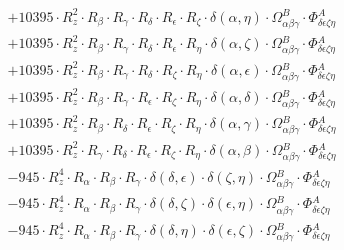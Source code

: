 \documentclass{article}
\begin{document}
\begin{equation}
\begin{array}{c}
 \\[0.2em] 		 + 10395 \cdot R_{z}^{2} \cdot R_{\beta{}} \cdot R_{\gamma{}} \cdot R_{\delta{}} \cdot R_{\epsilon{}} \cdot R_{\zeta{}} \cdot \delta{}\left(\alpha{}, \eta{}\right) \cdot \Omega{}^{B}_{\alpha{}\beta{}\gamma{}} \cdot \Phi{}^{A}_{\delta{}\epsilon{}\zeta{}\eta{}} 
 \\[0.2em] 		 + 10395 \cdot R_{z}^{2} \cdot R_{\beta{}} \cdot R_{\gamma{}} \cdot R_{\delta{}} \cdot R_{\epsilon{}} \cdot R_{\eta{}} \cdot \delta{}\left(\alpha{}, \zeta{}\right) \cdot \Omega{}^{B}_{\alpha{}\beta{}\gamma{}} \cdot \Phi{}^{A}_{\delta{}\epsilon{}\zeta{}\eta{}} 
 \\[0.2em] 		 + 10395 \cdot R_{z}^{2} \cdot R_{\beta{}} \cdot R_{\gamma{}} \cdot R_{\delta{}} \cdot R_{\zeta{}} \cdot R_{\eta{}} \cdot \delta{}\left(\alpha{}, \epsilon{}\right) \cdot \Omega{}^{B}_{\alpha{}\beta{}\gamma{}} \cdot \Phi{}^{A}_{\delta{}\epsilon{}\zeta{}\eta{}} 
 \\[0.2em] 		 + 10395 \cdot R_{z}^{2} \cdot R_{\beta{}} \cdot R_{\gamma{}} \cdot R_{\epsilon{}} \cdot R_{\zeta{}} \cdot R_{\eta{}} \cdot \delta{}\left(\alpha{}, \delta{}\right) \cdot \Omega{}^{B}_{\alpha{}\beta{}\gamma{}} \cdot \Phi{}^{A}_{\delta{}\epsilon{}\zeta{}\eta{}} 
 \\[0.2em] 		 + 10395 \cdot R_{z}^{2} \cdot R_{\beta{}} \cdot R_{\delta{}} \cdot R_{\epsilon{}} \cdot R_{\zeta{}} \cdot R_{\eta{}} \cdot \delta{}\left(\alpha{}, \gamma{}\right) \cdot \Omega{}^{B}_{\alpha{}\beta{}\gamma{}} \cdot \Phi{}^{A}_{\delta{}\epsilon{}\zeta{}\eta{}} 
 \\[0.2em] 		 + 10395 \cdot R_{z}^{2} \cdot R_{\gamma{}} \cdot R_{\delta{}} \cdot R_{\epsilon{}} \cdot R_{\zeta{}} \cdot R_{\eta{}} \cdot \delta{}\left(\alpha{}, \beta{}\right) \cdot \Omega{}^{B}_{\alpha{}\beta{}\gamma{}} \cdot \Phi{}^{A}_{\delta{}\epsilon{}\zeta{}\eta{}} 
 \\[0.2em] 		 - 945 \cdot R_{z}^{4} \cdot R_{\alpha{}} \cdot R_{\beta{}} \cdot R_{\gamma{}} \cdot \delta{}\left(\delta{}, \epsilon{}\right) \cdot \delta{}\left(\zeta{}, \eta{}\right) \cdot \Omega{}^{B}_{\alpha{}\beta{}\gamma{}} \cdot \Phi{}^{A}_{\delta{}\epsilon{}\zeta{}\eta{}} 
 \\[0.2em] 		 - 945 \cdot R_{z}^{4} \cdot R_{\alpha{}} \cdot R_{\beta{}} \cdot R_{\gamma{}} \cdot \delta{}\left(\delta{}, \zeta{}\right) \cdot \delta{}\left(\epsilon{}, \eta{}\right) \cdot \Omega{}^{B}_{\alpha{}\beta{}\gamma{}} \cdot \Phi{}^{A}_{\delta{}\epsilon{}\zeta{}\eta{}} 
 \\[0.2em] 		 - 945 \cdot R_{z}^{4} \cdot R_{\alpha{}} \cdot R_{\beta{}} \cdot R_{\gamma{}} \cdot \delta{}\left(\delta{}, \eta{}\right) \cdot \delta{}\left(\epsilon{}, \zeta{}\right) \cdot \Omega{}^{B}_{\alpha{}\beta{}\gamma{}} \cdot \Phi{}^{A}_{\delta{}\epsilon{}\zeta{}\eta{}} 

\end{array}
\end{equation}
\end{document}
